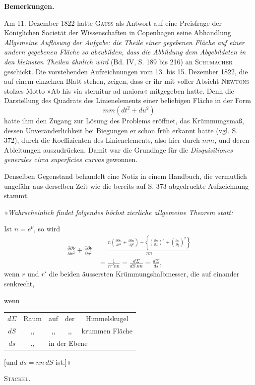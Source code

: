 %
\begin{center}\bfseries Bemerkungen.\end{center}
\noindent\hspace*{1.2em} Am 11. Dezember 1822 hatte \textsc{Gauss} als Antwort auf eine Preisfrage der Königlichen Societät der Wissenschaften in Copenhagen seine Abhandlung \textit{Allgemeine Auflösung der Aufgabe: die Theile einer gegebenen Fläche auf einer andern gegebenen Fläche so abzubilden, dass die Abbildung dem Abgebildeten in den kleinsten Theilen ähnlich wird} (Bd. IV, S. 189 bis 216) an \textsc{Schumacher} geschickt. Die vorstehenden Aufzeichnungen vom 13. bis 15. Dezember 1822, die auf einem einzelnen Blatt stehen, zeigen, dass er ihr mit voller Absicht \textsc{Newtons} stolzes Motto »Ab his via sternitur ad maiora« mitgegeben hatte. Denn die Darstellung des Quadrats des Linienelements einer beliebigen Fläche in der Form
\[
mm(dt^2+du^2)
\]
hatte ihm den Zugang zur Lösung des Problems eröffnet, das Krümmungsmaß, dessen Unveränderlichkeit bei Biegungen er schon früh erkannt hatte (vgl. S. 372), durch die Koeffizienten des Linienelements, also hier durch $mm$, und deren Ableitungen auszudrücken. Damit war die Grundlage für die \textit{Disquisitiones generales circa superficies curvas} gewonnen.

Denselben Gegenstand behandelt eine Notiz in einem Handbuch, die vermutlich ungefähr aus derselben Zeit wie die bereits auf S. 373 abgedruckte Aufzeichnung stammt.

{\itshape »Wahrscheinlich findet folgendes höchst zierliche allgemeine Theorem statt:

Ist $n=e^\nu$, so wird
\[
\begin{aligned}
\frac{\partial\partial\nu}{\partial x^2}+\frac{\partial\partial\nu}{\partial y^2}
&=\frac{n\left(\frac{\partial\partial n}{\partial x^2}+\frac{\partial\partial n}{\partial y^2}\right)-\left\{\left(\frac{\partial n}{\partial x}\right)^2+\left(\frac{\partial n}{\partial y}\right)^2\right\}}{nn}\\
&=\frac1{rr'nn}=\frac{d\Sigma}{dS.nn}=\frac{d\Sigma}{ds},
\end{aligned}
\]
wenn $r$ und $r'$ die beiden äussersten Krümmungshalbmesser, die auf einander senkrecht,

 wenn
\begin{center}
\begin{tabular}{ccccc}
$d\Sigma$&Raum&auf&der&Himmelskugel\\
$dS$&,,&,,&,,&krummen Fläche\\
$ds$&,,&\multicolumn{3}{l}{in der Ebene}
\end{tabular}
\end{center}
[und $ds=nn\,dS$ ist.]«\par}
\begin{flushright}\textsc{Stäckel.}\end{flushright}
